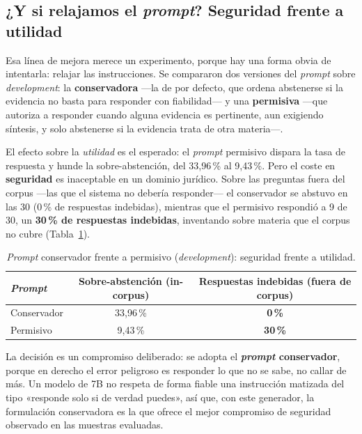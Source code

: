\subsection{¿Y si relajamos el \emph{prompt}? Seguridad frente a utilidad}
\label{subsec:abstencion-seguridad-utilidad}

Esa línea de mejora merece un experimento, porque hay una forma obvia de intentarla: relajar las instrucciones. Se compararon dos versiones del \emph{prompt} sobre \emph{development}: la \textbf{conservadora} —la de por defecto, que ordena abstenerse si la evidencia no basta para responder con fiabilidad— y una \textbf{permisiva} —que autoriza a responder cuando alguna evidencia es pertinente, aun exigiendo síntesis, y solo abstenerse si la evidencia trata de otra materia—.

El efecto sobre la \emph{utilidad} es el esperado: el \emph{prompt} permisivo dispara la tasa de respuesta y hunde la sobre-abstención, del 33,96\,\% al 9,43\,\%. Pero el coste en \textbf{seguridad} es inaceptable en un dominio jurídico. Sobre las preguntas fuera del corpus —las que el sistema no debería responder— el conservador se abstuvo en las 30 (0\,\% de respuestas indebidas), mientras que el permisivo respondió a 9 de 30, un \textbf{30\,\% de respuestas indebidas}, inventando sobre materia que el corpus no cubre (Tabla~\ref{tab:prompt-ab}).

\begin{table}[htbp]
    \centering
    \small
    \renewcommand{\arraystretch}{1.2}
    \caption{\emph{Prompt} conservador frente a permisivo (\emph{development}): seguridad frente a utilidad.}
    \label{tab:prompt-ab}
    \begin{tabular}{|l|c|c|}
        \hline
        \textbf{\emph{Prompt}} & \textbf{Sobre-abstención (in-corpus)} & \textbf{Respuestas indebidas (fuera de corpus)} \\
        \hline
        Conservador & 33,96\,\% & \textbf{0\,\%} \\
        Permisivo   & 9,43\,\%  & \textbf{30\,\%} \\
        \hline
    \end{tabular}
\end{table}

La decisión es un compromiso deliberado: se adopta el \textbf{\emph{prompt} conservador}, porque en derecho el error peligroso es responder lo que no se sabe, no callar de más. Un modelo de 7B no respeta de forma fiable una instrucción matizada del tipo «responde solo si de verdad puedes», así que, con este generador, la formulación conservadora es la que ofrece el mejor compromiso de seguridad observado en las muestras evaluadas.

